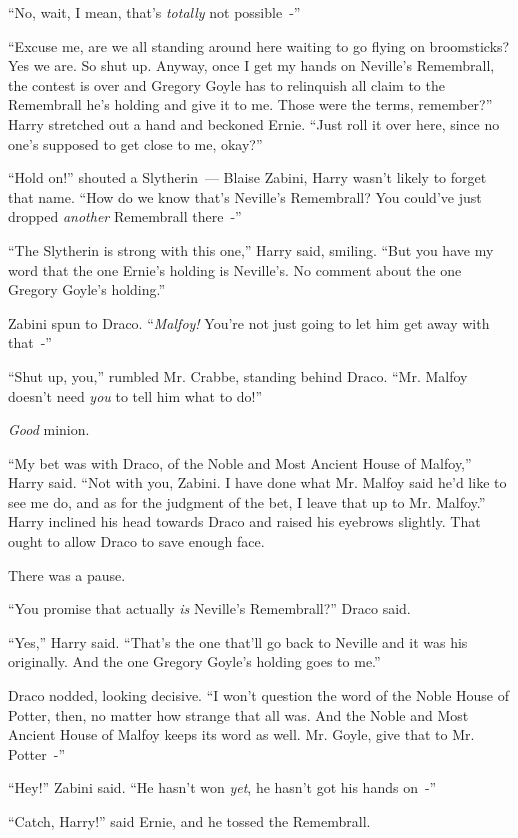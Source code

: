 ``No, wait, I mean, that's \emph{totally} not possible~-''

``Excuse me, are we all standing around here waiting to go flying on broomsticks? Yes we are. So shut up. Anyway, once I get my hands on Neville's Remembrall, the contest is over and Gregory Goyle has to relinquish all claim to the Remembrall he's holding and give it to me. Those were the terms, remember?'' Harry stretched out a hand and beckoned Ernie. ``Just roll it over here, since no one's supposed to get close to me, okay?''

``Hold on!'' shouted a Slytherin~--- Blaise Zabini, Harry wasn't likely to forget that name. ``How do we know that's Neville's Remembrall? You could've just dropped \emph{another} Remembrall there~-''

``The Slytherin is strong with this one,'' Harry said, smiling. ``But you have my word that the one Ernie's holding is Neville's. No comment about the one Gregory Goyle's holding.''

Zabini spun to Draco. ``\emph{Malfoy!} You're not just going to let him get away with that~-''

``Shut up, you,'' rumbled Mr. Crabbe, standing behind Draco. ``Mr. Malfoy doesn't need \emph{you} to tell him what to do!''

\emph{Good} minion.

``My bet was with Draco, of the Noble and Most Ancient House of Malfoy,'' Harry said. ``Not with you, Zabini. I have done what Mr. Malfoy said he'd like to see me do, and as for the judgment of the bet, I leave that up to Mr. Malfoy.'' Harry inclined his head towards Draco and raised his eyebrows slightly. That ought to allow Draco to save enough face.

There was a pause.

``You promise that actually \emph{is} Neville's Remembrall?'' Draco said.

``Yes,'' Harry said. ``That's the one that'll go back to Neville and it was his originally. And the one Gregory Goyle's holding goes to me.''

Draco nodded, looking decisive. ``I won't question the word of the Noble House of Potter, then, no matter how strange that all was. And the Noble and Most Ancient House of Malfoy keeps its word as well. Mr. Goyle, give that to Mr. Potter~-''

``Hey!'' Zabini said. ``He hasn't won \emph{yet}, he hasn't got his hands on~-''

``Catch, Harry!'' said Ernie, and he tossed the Remembrall.

